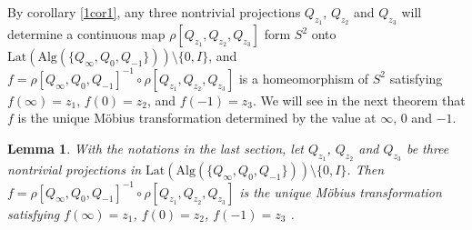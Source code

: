 \documentclass{amsart}
\newcommand{\Lat}{\mathrm{Lat}}
\newcommand{\Alg}{\mathrm{Alg}}
\newtheorem{lemma}{Lemma}[section]
\begin{document}
By corollary \ref{1cor1}, any three nontrivial projections $Q_{z_1}$, $Q_{z_2}$ and $Q_{z_3}$ will determine a continuous map $\rho[Q_{z_1}, Q_{z_2}, Q_{z_3}]$ form $S^2$ onto $\Lat(\Alg(\{Q_{\infty}, Q_{0}, Q_{-1}\})) \setminus \{0, I\}$, and  $f = \rho[Q_{\infty}, Q_{0}, Q_{-1}]^{-1} \circ \rho[Q_{z_1}, Q_{z_2}, Q_{z_3}]$ is a homeomorphism of $S^2$ satisfying  
$f(\infty) = z_1$, $f(0) = z_2$, and $f(-1)  = z_3$. We will see in the next theorem that $f$ is the unique M\"{o}bius transformation
determined by the value at $\infty$, $0$ and $-1$.

\begin{lemma}\label{2lemma0}
With the notations in the last section, let 
$Q_{z_1}$, $Q_{z_2}$ and $Q_{z_3}$ be three nontrivial projections in $\Lat(\Alg(\{Q_{\infty}, Q_{0}, Q_{-1}\})) \setminus \{0, I\}$.  
Then  $f =\rho[Q_{\infty}, Q_{0}, Q_{-1}]^{-1} \circ  \rho[Q_{z_1}, Q_{z_2}, Q_{z_3}]$ is the
unique M\"{o}bius transformation satisfying $f(\infty) = z_1$, $f(0) = z_2$, $f(-1) = z_3$ .
\end{lemma}
\end{document}

